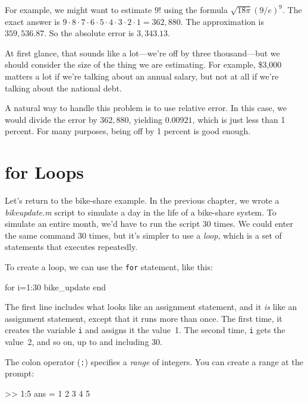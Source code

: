 \documentclass[../../book.tex]{subfiles}
\begin{document}
For example, we might want to estimate $9!$ using the formula
$\sqrt {18 \pi} ( 9 / e)^9$.  The exact answer is $9 \cdot 8 \cdot 7 \cdot 6
\cdot 5 \cdot 4 \cdot 3 \cdot 2 \cdot 1 = 362,880$.  The approximation
is $359,536.87$.  So the absolute error is $3,343.13$.

At first glance, that sounds like a lot---we're off by three
thousand---but we should consider the size of the
thing we are estimating.  For example, \$3,000 matters a lot
if we're talking about an annual salary, but not at all if we're talking about the national debt.

A natural way to handle this problem is to use relative
error.
In this case, we would divide the error
by $362,880$, yielding $0.00921$, which is just less than 1 percent.
For many purposes, being off by 1 percent is good enough.


\section{for Loops}


Let's return to the bike-share example.
In the previous chapter, we wrote a \emph{bike\textunderscore update.m} script to simulate a
day in the life of a bike-share system. To simulate an entire
month, we'd have to run the script 30 times. We could enter the same command 30 times, but it's simpler to use a \emph{loop}, which is a set of statements that executes repeatedly.

To create a loop, we can use the \lstinline{for} statement, like this:

\begin{code}
for i=1:30
    bike_update
end
\end{code}

The first line includes what looks like an assignment statement, and it \emph{is}
like an assignment statement, except that it runs more than once.  The
first time, it creates the variable \lstinline{i} and assigns it the
value~1.  The second time, \lstinline{i} gets the value~2, and so on, up to
and including 30.


The colon operator (\lstinline{:}) specifies a \emph{range} of integers.
You can create a range at the prompt:

\begin{code}
>> 1:5
ans =  1     2     3     4     5
\end{code}
\end{document}
